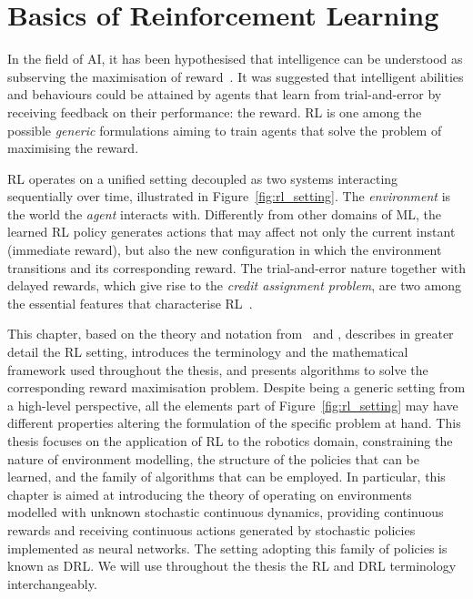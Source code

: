 \acresetall
\chapter{Basics of Reinforcement Learning}
\label{ch:reinforcement_learning}

In the field of \ac{AI}, it has been hypothesised that intelligence can be understood as subserving the maximisation of reward~\parencite{silver_reward_2021}.
It was suggested that intelligent abilities and behaviours could be attained by agents that learn from trial-and-error by receiving feedback on their performance: the reward.
\ac{RL} is one among the possible \emph{generic} formulations aiming to train agents that solve the problem of maximising the reward.

\acl{RL} operates on a unified setting decoupled as two systems interacting sequentially over time, illustrated in Figure~\ref{fig:rl_setting}.
The \emph{environment} is the world the \emph{agent} interacts with.
Differently from other domains of \ac{ML}, the learned \ac{RL} policy generates actions that may affect not only the current instant (immediate reward), but also the new configuration in which the environment transitions and its corresponding reward.
The trial-and-error nature together with delayed rewards, which give rise to the \emph{credit assignment problem}, are two among the essential features that characterise \acs{RL}~\parencite{sutton_reinforcement_2018}.

This chapter, based on the theory and notation from~\textcite{achiam_spinning_2018} and \textcite{dong_deep_2020}, describes in greater detail the \acl{RL} setting, introduces the terminology and the mathematical framework used throughout the thesis, and presents algorithms to solve the corresponding reward maximisation problem.
Despite being a generic setting from a high-level perspective, all the elements part of Figure~\ref{fig:rl_setting} may have different properties altering the formulation of the specific problem at hand.
This thesis focuses on the application of \ac{RL} to the robotics domain, constraining the nature of environment modelling, the structure of the policies that can be learned, and the family of algorithms that can be employed.
In particular, this chapter is aimed at introducing the theory of operating on environments modelled with unknown stochastic continuous dynamics, providing continuous rewards and receiving continuous actions generated by stochastic policies implemented as neural networks.
The setting adopting this family of policies is known as \ac{DRL}.
We will use throughout the thesis the \ac{RL} and \ac{DRL} terminology interchangeably.

